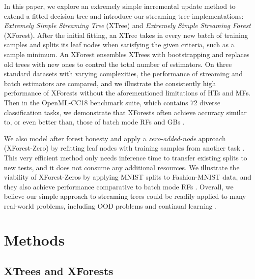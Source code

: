 In this paper, we explore an extremely simple incremental update method to extend a fitted decision tree and introduce our streaming tree implementations: \textit{Extremely Simple Streaming Tree} (XTree) and \textit{Extremely Simple Streaming Forest} (XForest).
After the initial fitting, an XTree takes in every new batch of training samples and splits its leaf nodes when satisfying the given criteria, such as a sample minimum. An XForest ensembles XTrees with bootstrapping and replaces old trees with new ones to control the total number of estimators.
On three standard datasets with varying complexities, the performance of streaming and batch estimators are compared, and we illustrate the consistently high performance of XForests without the aforementioned limitations of HTs and MFs. Then in the OpenML-CC18 benchmark suite,
which contains 72 diverse classification tasks, we demonstrate that XForests often achieve accuracy similar to, or even better than, those of batch mode RFs and GBs \citep{vanschoren_openml_2013, bischl_openml_2019}.

We also model after forest honesty and apply a \textit{zero-added-node} approach (XForest-Zero) by refitting leaf nodes with training samples from another task \citep{athey_generalized_2018}. This very efficient method only needs inference time to transfer existing splits to new tests, and it does not consume any additional resources. We illustrate the viability of XForest-Zeros by applying MNIST splits to Fashion-MNIST data, and they also achieve performance comparative to batch mode RFs \citep{lecun_gradient-based_1998, xiao_fashion-mnist_2017}.
Overall, we believe our simple approach to streaming trees could be readily applied to many real-world problems, including OOD problems and continual learning \citep{geisa_towards_2021, van_de_ven_three_2019}.

\section{Methods} 
\label{methods}

\subsection{XTrees and XForests}

